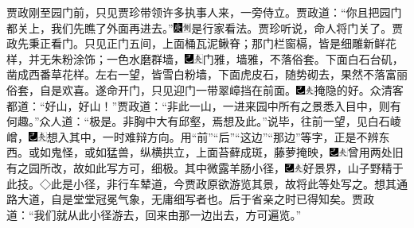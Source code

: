 贾政刚至园门前，只见贾珍带领许多执事人来，一旁侍立。贾政道：``你且把园门都关上，我们先瞧了外面再进去。''{\includegraphics[width=3mm]{../Images/00004}\includegraphics[width=3mm]{../Images/00011}\footnotesize \kaishu 是行家看法。}贾珍听说，命人将门关了。贾政先秉正看门。只见正门五间，上面桶瓦泥鳅脊；那门栏窗槅，皆是细雕新鲜花样，并无朱粉涂饰；一色水磨群墙，{\includegraphics[width=3mm]{../Images/00003}\includegraphics[width=3mm]{../Images/00012}\footnotesize \kaishu 门雅，墙雅，不落俗套。}下面白石台矶，凿成西番草花样。左右一望，皆雪白粉墙，下面虎皮石，随势砌去，果然不落富丽俗套，自是欢喜。遂命开门，只见迎门一带翠嶂挡在前面。{\includegraphics[width=3mm]{../Images/00003}\includegraphics[width=3mm]{../Images/00012}\footnotesize \kaishu 掩隐的好。}众清客都道：``好山，好山！''贾政道：``非此一山，一进来园中所有之景悉入目中，则有何趣。''众人道：``极是。非胸中大有邱壑，焉想及此。''说毕，往前一望，见白石崚嶒，{\includegraphics[width=3mm]{../Images/00003}\includegraphics[width=3mm]{../Images/00012}\footnotesize \kaishu 想入其中，一时难辩方向。用``前''``后''``这边''``那边''等字，正是不辨东西。}或如鬼怪，或如猛兽，纵横拱立，上面苔藓成斑，藤萝掩映，{\includegraphics[width=3mm]{../Images/00003}\includegraphics[width=3mm]{../Images/00012}\footnotesize \kaishu 曾用两处旧有之园所改，故如此写方可，细极。}其中微露羊肠小径，{\includegraphics[width=3mm]{../Images/00003}\includegraphics[width=3mm]{../Images/00012}\footnotesize \kaishu 好景界，山子野精于此技。◇此是小径，非行车辇道，今贾政原欲游览其景，故将此等处写之。想其通路大道，自是堂堂冠冕气象，无庸细写者也。后于省亲之时已得知矣。}贾政道：``我们就从此小径游去，回来由那一边出去，方可遍览。''

